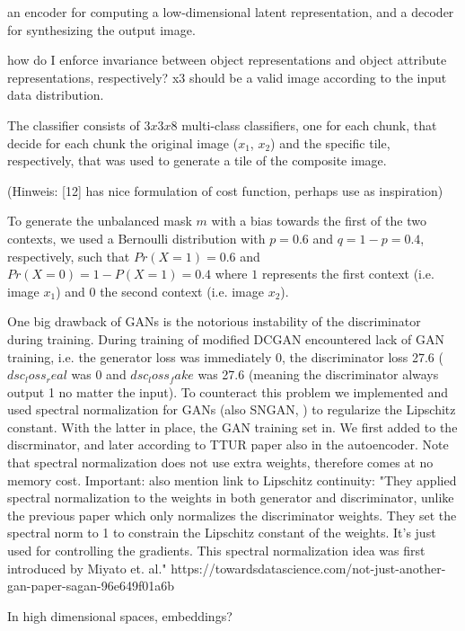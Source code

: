 \documentclass[11pt,a4paper]{article}
\begin{document}
\par an encoder for computing a low-dimensional latent representation, and a decoder for synthesizing the output image.

how do I enforce invariance between object representations and object attribute representations, respectively?
x3 should be a valid image according to the input data distribution.

The classifier consists of $3x3x8$ multi-class classifiers, one for each chunk, that decide for each chunk the original image ($x_1$, $x_2$) and the specific tile, respectively, that was used to generate a tile of the composite image.

(Hinweis: [12] has nice formulation of cost function, perhaps use as inspiration)

\par To generate the unbalanced mask $m$ with a bias towards the first of the two contexts, we used a Bernoulli distribution with $p=0.6$ and $q=1-p=0.4$, respectively, such that $Pr(X=1)=0.6$ and $Pr(X=0)=1-P(X=1)=0.4$ where $1$ represents the first context (i.e. image $x_1$) and $0$ the second context (i.e. image $x_2$).

\par One big drawback of GANs is the notorious instability of the discriminator during training. During training of modified DCGAN encountered lack of GAN training, i.e. the generator loss was immediately 0, the discriminator loss 27.6 ($dsc_loss_real$ was 0 and $dsc_loss_fake$ was 27.6 (meaning the discriminator always output 1 no matter the input). To counteract this problem we implemented and used spectral normalization for GANs (also SNGAN, \cite{1802.05957}) to regularize the Lipschitz constant. With the latter in place, the GAN training set in. We first added to the discrminator, and later according to TTUR paper also in the autoencoder. Note that spectral normalization does not use extra weights, therefore comes at no memory cost.
Important: also mention link to Lipschitz continuity: "They applied spectral normalization to the weights in both generator and discriminator, unlike the previous paper which only normalizes the discriminator weights. They set the spectral norm to 1 to constrain the Lipschitz constant of the weights. It’s just used for controlling the gradients. This spectral normalization idea was first introduced by Miyato et. al." https://towardsdatascience.com/not-just-another-gan-paper-sagan-96e649f01a6b

\par In high dimensional spaces, embeddings?
\end{document}
